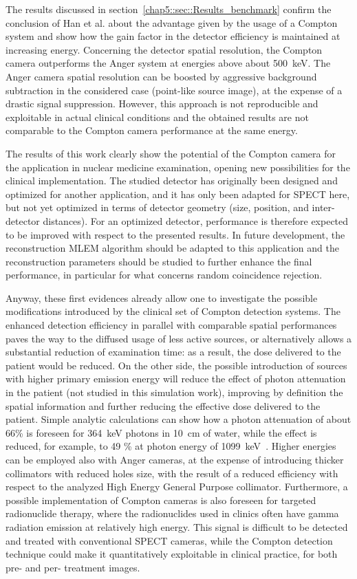 The results discussed in section~\ref{chap5::sec::Results_benchmark} confirm the conclusion of Han et al. about the advantage given by the usage of a Compton system and show how the gain factor in the detector efficiency is maintained at increasing energy. Concerning the detector spatial resolution, the Compton camera outperforms the Anger system at energies above about 500~keV. The Anger camera spatial resolution can be boosted by aggressive background subtraction in the considered case (point-like source image), at the expense of a drastic signal suppression. However, this approach is not reproducible and exploitable in actual clinical conditions and the obtained results are not comparable to the Compton camera performance at the same energy.

The results of this work clearly show the potential of the Compton camera for the application in nuclear medicine examination, opening new possibilities for the clinical implementation. The studied detector has originally been designed and optimized for another application, and it has only been adapted for SPECT here, but not yet optimized in terms of detector geometry (size, position, and inter-detector distances). For an optimized detector, performance is therefore expected to be improved with respect to the presented results. In future development, the reconstruction MLEM algorithm should be adapted to this application and the reconstruction parameters should be studied to further enhance the final performance, in particular for what concerns random coincidence rejection.

Anyway, these first evidences already allow one to investigate the possible modifications introduced by the clinical set of Compton detection systems. The enhanced detection efficiency in parallel with comparable spatial performances paves the way to the diffused usage of less active sources, or alternatively allows a substantial reduction of examination time: as a result, the dose delivered to the patient would be reduced. On the other side, the possible introduction of sources with higher primary emission energy will reduce the effect of photon attenuation in the patient (not studied in this simulation work), improving by definition the spatial information and further reducing the effective dose delivered to the patient. Simple analytic calculations can show how a photon attenuation of about 66\% is foreseen for 364~keV photons in 10~cm of water, while the effect is reduced, for example, to 49 \% at photon energy of 1099~keV~\parencite{Hubbell1987}. Higher energies can be employed also with Anger cameras, at the expense of introducing thicker collimators with reduced holes size, with the result of a reduced efficiency with respect to the analyzed High Energy General Purpose collimator.
Furthermore, a possible implementation of Compton cameras is also foreseen for targeted radionuclide therapy, where the radionuclides used in clinics often have gamma radiation emission at relatively high energy. This signal is difficult to be detected and treated with conventional SPECT cameras, while the Compton detection technique could make it quantitatively exploitable in clinical practice, for both pre- and per- treatment images.
   
